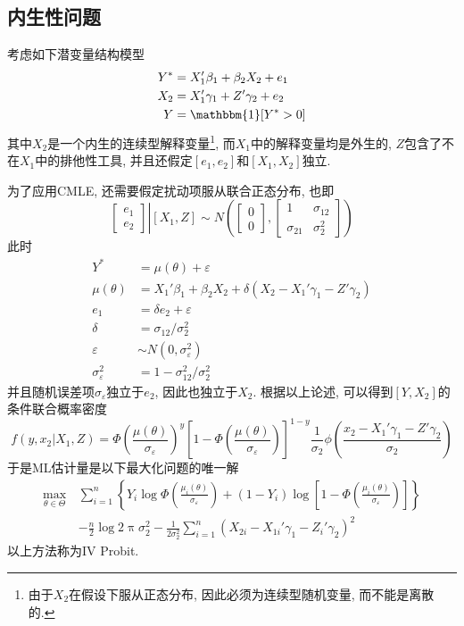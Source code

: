 \documentclass[cn, 12pt, math=mtpro2, bibstyle=apa, blue, twocol]{elegantbook}
\begin{document}
\subsection{内生性问题}
考虑如下潜变量结构模型
\begin{align}
Y^\ast&=X_1'\beta_1+\beta_2X_2+e_1 \label{eq10.6} \\
X_2&=X_1'\gamma_1+Z'\gamma_2+e_2 \label{eq10.7} \\
Y&=\mathbbm{1}[Y^\ast>0]
\end{align}
其中$X_2$是一个内生的连续型解释变量\footnote{由于$X_2$在假设下服从正态分布, 因此必须为连续型随机变量, 而不能是离散的.}, 而$X_1$中的解释变量均是外生的, $Z$包含了不在$X_1$中的排他性工具, 并且还假定$[e_1,e_2]$和$[X_1,X_2]$独立.

为了应用CMLE, 还需要假定扰动项服从联合正态分布, 也即
$$\left.\begin{bmatrix}
    e_1 \\
    e_2
  \end{bmatrix}\right|[X_1,Z]\sim N\left(\begin{bmatrix}
                                           0 \\
                                           0
                                         \end{bmatrix},\begin{bmatrix}
                                                         1 & \sigma_{12} \\
                                                         \sigma_{21} & \sigma_2^2
                                                       \end{bmatrix}\right)$$
此时
\begin{align*}
Y^\ast&=\mu(\theta)+\varepsilon \\
\mu(\theta)&=X_1'\beta_1+\beta_2X_2+\delta(X_2-X_1'\gamma_1-Z'\gamma_2) \\
e_1&=\delta e_2+\varepsilon \\
\delta&=\sigma_{12}/\sigma_2^2 \\
\varepsilon&\sim N(0,\sigma_\varepsilon^2) \\
\sigma_\varepsilon^2&=1-\sigma_{12}^2/\sigma_2^2
\end{align*}
并且随机误差项$\sigma_\varepsilon$独立于$e_2$, 因此也独立于$X_2$. 根据以上论述, 可以得到$[Y,X_2]$的条件联合概率密度
$$f(y,x_2|X_1,Z)=\Phi\left(\frac{\mu(\theta)}{\sigma_\varepsilon}\right)^{y}\left[1-\Phi\left(\frac{\mu(\theta)}{\sigma_\varepsilon}\right)\right]^{1-y}\frac{1}{\sigma_2}\phi\left(\frac{x_2-X_1'\gamma_1-Z'\gamma_2}{\sigma_2}\right)$$
于是ML估计量是以下最大化问题的唯一解
\begin{align*}
\max_{\theta\in\Theta}\,&\sum_{i=1}^{n}\left\{Y_i\log\Phi\left(\frac{\mu_i(\theta)}{\sigma_\varepsilon}\right)+(1-Y_i)\log\left[1-\Phi\left(\frac{\mu_i(\theta)}{\sigma_\varepsilon}\right)\right]\right\} \\
&-\frac{n}{2}\log2\uppi\sigma_2^2-\frac{1}{2\sigma_2^2}\sum_{i=1}^{n}(X_{2i}-X_{1i}'\gamma_1-Z_i'\gamma_2)^2
\end{align*}
以上方法称为IV Probit.
\end{document}
